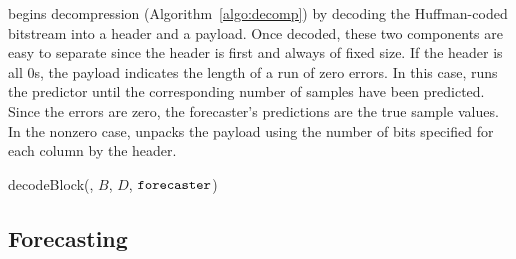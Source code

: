 
\minesp begins decompression (Algorithm~\ref{algo:decomp}) by decoding the Huffman-coded bitstream into a header and a payload. Once decoded, these two components are easy to separate since the header is first and always of fixed size. If the header is all 0s, the payload indicates the length of a run of zero errors. In this case, \minesp runs the predictor until the corresponding number of samples have been predicted. Since the errors are zero, the forecaster's predictions are the true sample values. In the nonzero case, \minesp unpacks the payload using the number of bits specified for each column by the header.

\begin{algorithm}[h]
\caption{decodeBlock(\bytes, $B$, $D$, $\texttt{forecaster}$)}
\label{algo:decomp}
\begin{algorithmic}[1]


 
    \EndFor
\Else {}
\EndFor
\EndIf
\end{algorithmic}
\end{algorithm}

\subsection{Forecasting}

